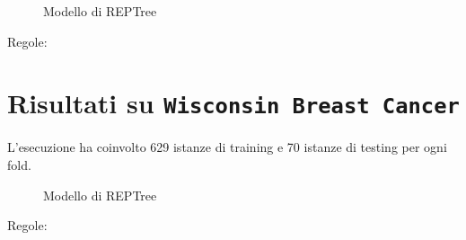 \begin{figure}[htb]
	\caption{Modello di REPTree}
\end{figure}

\begin{mdframed}[frametitle=Esecuzione JRip]
	\scriptsize
\end{mdframed}


\noindent
\normalsize Regole:
\scriptsize

\pagebreak

\section{Risultati su \texttt{Wisconsin Breast Cancer}}

\normalsize L'esecuzione ha coinvolto 629 istanze di training e 70 istanze di testing per ogni fold.


\begin{mdframed}[frametitle=Esecuzione NaiveBayesSimple]
	\footnotesize
\end{mdframed}

\begin{mdframed}[frametitle=Esecuzione REPTree]
	\footnotesize
\end{mdframed}


\begin{figure}[htb]
	\caption{Modello di REPTree}
\end{figure}

\begin{mdframed}[frametitle=Esecuzione JRip]
	\footnotesize
\end{mdframed}


\noindent
\normalsize Regole:
\footnotesize